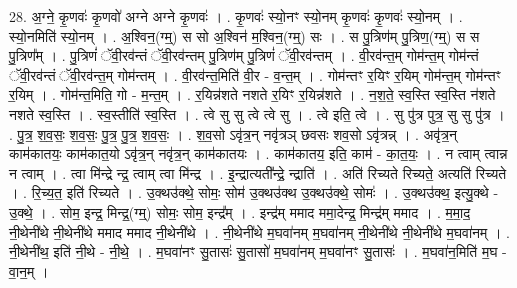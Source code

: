 \documentclass[17pt]{extarticle}
\begin{document}
28. अ॒ग्ने॒ कृ॒णवः॑ कृ॒णवो॑ अग्ने अग्ने कृ॒णवः॑ । . कृ॒णवः॑ स्यो॒नꣳ स्यो॒नम् कृ॒णवः॑ कृ॒णवः॑ स्यो॒नम् । . स्यो॒नमिति॑ स्यो॒नम् । . अ॒श्विन॒(ग्म्॒) स सो अ॒श्विन॑ म॒श्विन॒(ग्म्॒) सः । . स पु॒त्रिण॑म् पु॒त्रिण॒(ग्म्॒) स स पु॒त्रिण᳚म् । . पु॒त्रिणं॑ ॅवी॒रव॑न्तं ॅवी॒रव॑न्तम् पु॒त्रिण॑म् पु॒त्रिणं॑ ॅवी॒रव॑न्तम् । . वी॒रव॑न्त॒म् गोम॑न्त॒म् गोम॑न्तं ॅवी॒रव॑न्तं ॅवी॒रव॑न्त॒म् गोम॑न्तम् । . वी॒रव॑न्त॒मिति॑ वी॒र - व॒न्त॒म् । . गोम॑न्तꣳ र॒यिꣳ र॒यिम् गोम॑न्त॒म् गोम॑न्तꣳ र॒यिम् । . गोम॑न्त॒मिति॒ गो - म॒न्त॒म् । . र॒यिन्न॑शते नशते र॒यिꣳ र॒यिन्न॑शते । . न॒श॒ते॒ स्व॒स्ति स्व॒स्ति न॑शते नशते स्व॒स्ति । . स्व॒स्तीति॑ स्व॒स्ति । . त्वे सु सु त्वे त्वे सु । . त्वे इति॒ त्वे । . सु पु॑त्र पुत्र॒ सु सु पु॑त्र । . पु॒त्र॒ श॒व॒सः॒ श॒व॒सः॒ पु॒त्र॒ पु॒त्र॒ श॒व॒सः॒ । . श॒व॒सो ऽवृ॑त्र॒न् नवृ॑त्रञ् छवसः शव॒सो ऽवृ॑त्रन्न् । . अवृ॑त्र॒न् काम॑कातयः॒ काम॑कात॒यो ऽवृ॑त्र॒न् नवृ॑त्र॒न् काम॑कातयः । . काम॑कातय॒ इति॒ काम॑ - का॒त॒यः॒ । . न त्वाम् त्वान्न न त्वाम् । . त्वा मि॑न्द्रे न्द्र॒ त्वाम् त्वा मि॑न्द्र । . इ॒न्द्रात्यती᳚न्द्रे॒ न्द्राति॑ । . अति॑ रिच्यते रिच्यते॒ अत्यति॑ रिच्यते । . रि॒च्य॒त॒ इति॑ रिच्यते । . उ॒क्थ‌उ॑क्थे॒ सोमः॒ सोम॑ उ॒क्थ‌उ॑क्थ उ॒क्थ‌उ॑क्थे॒ सोमः॑ । . उ॒क्थ‌उ॑क्थ॒ इत्यु॒क्थे - उ॒क्थे॒ । . सोम॒ इन्द्र॒ मिन्द्र॒(ग्म्॒) सोमः॒ सोम॒ इन्द्र᳚म् । . इन्द्र॑म् ममाद ममा॒देन्द्र॒ मिन्द्र॑म् ममाद । . म॒मा॒द॒ नी॒थेनी॑थे नी॒थेनी॑थे ममाद ममाद नी॒थेनी॑थे । . नी॒थेनी॑थे म॒घवा॑नम् म॒घवा॑नम् नी॒थेनी॑थे नी॒थेनी॑थे म॒घवा॑नम् । . नी॒थेनी॑थ॒ इति॑ नी॒थे - नी॒थे॒ । . म॒घवा॑नꣳ सु॒तासः॑ सु॒तासो॑ म॒घवा॑नम् म॒घवा॑नꣳ सु॒तासः॑ । . म॒घवा॑न॒मिति॑ म॒घ - वा॒न॒म् । \newline
\end{document}
